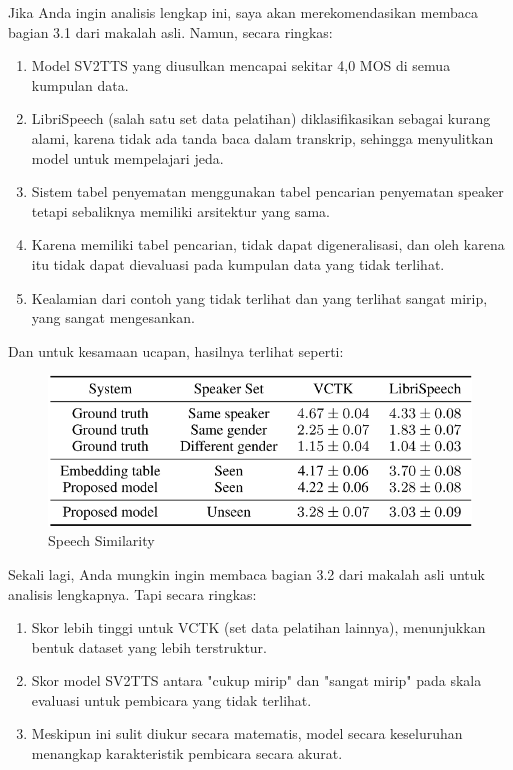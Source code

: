 Jika Anda ingin analisis lengkap ini, saya akan merekomendasikan membaca bagian 3.1 dari makalah asli. Namun, secara ringkas:
\begin{enumerate}
\item Model SV2TTS yang diusulkan mencapai sekitar 4,0 MOS di semua kumpulan data.
\item LibriSpeech (salah satu set data pelatihan) diklasifikasikan sebagai kurang alami, karena tidak ada tanda baca dalam transkrip, sehingga menyulitkan model untuk mempelajari jeda.
\item Sistem tabel penyematan menggunakan tabel pencarian penyematan speaker tetapi sebaliknya memiliki arsitektur yang sama. \item Karena memiliki tabel pencarian, tidak dapat digeneralisasi, dan oleh karena itu tidak dapat dievaluasi pada kumpulan data yang tidak terlihat.
\item Kealamian dari contoh yang tidak terlihat dan yang terlihat sangat mirip, yang sangat mengesankan.
\end{enumerate}
Dan untuk kesamaan ucapan, hasilnya terlihat seperti:
\begin{figure}[H]
        \centerline{\includegraphics[scale=.35]{figures/hasil1}}
        \caption{Speech Similarity\cite{DBLP:journals/corr/abs-1806-04558}}
		\label{similar}
\end{figure}
Sekali lagi, Anda mungkin ingin membaca bagian 3.2 dari makalah asli untuk analisis lengkapnya. Tapi secara ringkas:
\begin{enumerate}
\item Skor lebih tinggi untuk VCTK (set data pelatihan lainnya), menunjukkan bentuk dataset yang lebih terstruktur.
\item Skor model SV2TTS antara "cukup mirip" dan "sangat mirip" pada skala evaluasi untuk pembicara yang tidak terlihat.
\item Meskipun ini sulit diukur secara matematis, model secara keseluruhan menangkap karakteristik pembicara secara akurat.
\end{enumerate}